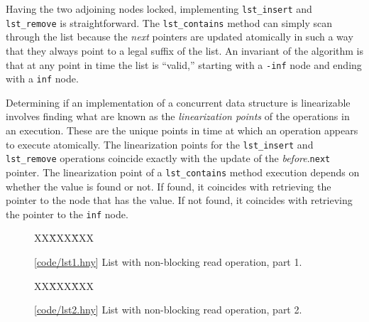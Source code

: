 \documentclass{report}
\newcommand{\harmonysource}[1]{
\begin{tabbing}
XX\=XXX\=XXX\kill
    
\end{tabbing}
}
\newcommand{\harmonylink}[1]{%
[\href{https://www.cs.cornell.edu/home/rvr/harmony/#1}{\underline{#1}}]%
}
\newenvironment{code}{
\tcolorbox
}{
\endtcolorbox
}
\begin{document}
Having the two adjoining nodes locked, implementing \texttt{lst\_insert}
and \texttt{lst\_remove} is straightforward.
The \texttt{lst\_contains} method can simply scan through the list
because the \textit{next} pointers are updated atomically in such a
way that they always point to a legal suffix of the list.
An invariant of the algorithm is that at any point in time the
list is ``valid,'' starting with a \texttt{-inf} node and ending
with a \texttt{inf} node.

Determining if an implementation of a concurrent data structure
is linearizable involves finding what are known as the
\emph{linearization points}
%
of the operations in an execution.  These are the unique
points in time at which an operation appears to execute atomically.
The linearization points for the \texttt{lst\_insert} and
\texttt{lst\_remove} operations coincide exactly with the update
of the \textit{before}.\texttt{next} pointer.
The linearization point of a \texttt{lst\_contains} method
execution depends on whether the value is found or not.
If found, it coincides with retrieving the pointer to the node
that has the value.
If not found, it coincides with retrieving the pointer to the
\texttt{inf} node.

\begin{figure}
\begin{code}
\harmonysource{lst1}
\end{code}
\caption{\harmonylink{code/lst1.hny} List with non-blocking read operation, part 1.}
\label{fig:lst1}
\end{figure}

\begin{figure}
\begin{code}
\harmonysource{lst2}
\end{code}
\caption{\harmonylink{code/lst2.hny} List with non-blocking read operation, part 2.}
\label{fig:lst2}
\end{figure}
\end{document}
